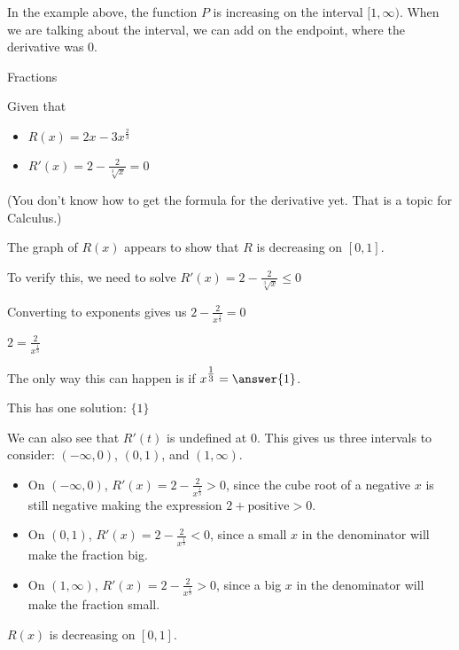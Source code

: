 \documentclass{ximera}
\begin{document}
In the example above, the function $P$ is increasing on the interval $[1, \infty)$.  When we are talking about the interval, we can add on the endpoint, where the derivative was $0$.


















\begin{example}  Fractions


Given that

\begin{itemize}
\item $R(x) = 2x - 3 x^{\tfrac{2}{3}}$
\item $R'(x) = 2 - \frac{2}{\sqrt[3]{x}} = 0$
\end{itemize}
(You don't know how to get the formula for the derivative yet.  That is a topic for Calculus.)

The graph of $R(x)$ appears to show that $R$ is decreasing on $[0, 1]$.
\begin{center}
\end{center}










To verify this, we need to solve $R'(x) = 2 - \frac{2}{\sqrt[3]{x}}  \leq 0$



\begin{explanation}


Converting to exponents gives us $2 - \frac{2}{x^{\tfrac{1}{3}}} = 0$


$2 = \frac{2}{x^{\tfrac{1}{3}}}$

The only way this can happen is if $x^{\tfrac{1}{3}} = \answer{1}$.

This has one solution: $\{  1  \}$



We can also see that $R'(t)$ is undefined at $0$.  This gives us three intervals to consider: $(-\infty, 0)$, $(0, 1)$, and $(1, \infty)$.



\begin{itemize}
\item On $(-\infty, 0)$, $R'(x) = 2 - \frac{2}{x^{\tfrac{1}{3}}} > 0$, since the cube root of a negative $x$ is still negative making the expression $2 + \text{positive} > 0$.
\item On $(0,1)$, $R'(x) = 2 - \frac{2}{x^{\tfrac{1}{3}}} < 0$, since a small $x$ in the denominator will make the fraction big.
\item On $(1,\infty)$, $R'(x) = 2 - \frac{2}{x^{\tfrac{1}{3}}} > 0$, since a big $x$ in the denominator will make the fraction small.
\end{itemize}


$R(x)$ is decreasing on $[0,1]$.


\end{explanation}
\end{example}
\end{document}
